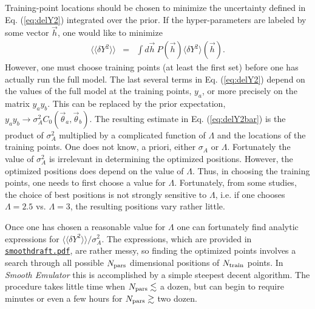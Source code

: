 \documentclass[UserManual.tex]{subfiles}
\begin{document}
Training-point locations should be chosen to minimize the uncertainty defined in Eq. (\ref{eq:delY2}) integrated over the prior. If the hyper-parameters are labeled by some vector $\vec{h}$, one would like to minimize
\begin{eqnarray}\label{eq:delY2bar}
\langle\langle \delta Y^2\rangle\rangle&=&
\int d\vec{h}~P(\vec{h})\langle \delta Y^2\rangle(\vec{h}).
\end{eqnarray}
However, one must choose training points (at least the first set) before one has actually run the full model. The last several terms in Eq. (\ref{eq:delY2}) depend on the values of the full model at the training points, $y_a$, or more precisely on the matrix $y_ay_b$. This can be replaced by the prior expectation, $y_ay_b\rightarrow \sigma_A^2C_0(\vec{\theta}_a,\vec{\theta}_b)$. The resulting estimate in Eq. (\ref{eq:delY2bar}) is the product of $\sigma_A^2$ multiplied by a complicated function of $\Lambda$ and the locations of the training points. One does not know, a priori, either $\sigma_A$ or $\Lambda$. Fortunately the value of $\sigma_A^2$ is irrelevant in determining the optimized positions. However, the optimized positions does depend on the value of $\Lambda$. Thus, in choosing the training points, one needs to first choose a value for $\Lambda$. Fortunately, from some studies, the choice of best positions is not strongly sensitive to $\Lambda$, i.e. if one chooses $\Lambda=2.5$ vs. $\Lambda=3$, the resulting positions vary rather little. 

Once one has chosen a reasonable value for $\Lambda$ one can fortunately find analytic expressions for $\langle\langle \delta Y^2\rangle\rangle/\sigma_A^2$. The expressions, which are provided in \href{./smoothdraft.pdf}{{\tt smoothdraft.pdf}}, are rather messy, so finding the optimized points involves a search through all possible $N_{\rm pars}$ dimensional positions of $N_{\rm train}$ points. In {\it Smooth Emulator} this is accomplished by a simple steepest decent algorithm. The procedure takes little time when $N_{\rm pars}\lesssim$ a dozen, but can begin to require minutes or even a few hours for $N_{\rm pars}\gtrsim$ two dozen. 
\end{document}
